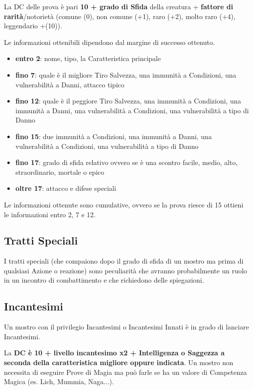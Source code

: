 \begin{multicols}{2}
\medskip

La DC delle prova è pari \textbf{10 + grado di Sfida} della creatura + \textbf{fattore di rarità}/notorietà (comune (0), non comune (+1), raro (+2), molto raro (+4), leggendario +(10)).

Le informazioni ottenibili dipendono dal margine di successo ottenuto.

\noindent\begin{itemize} \setlength{\itemsep}{0pt}
\item \textbf{entro 2}: nome, tipo, la Caratteristica principale
\item \textbf{fino 7}: quale è il migliore Tiro Salvezza, una immunità a Condizioni, una vulnerabilità a Danni, attacco tipico
\item \textbf{fino 12}: quale è il peggiore Tiro Salvezza, una immunità a Condizioni, una immunità a Danni, una vulnerabilità a Condizioni, una vulnerabilità a tipo di Danno
\item \textbf{fino 15}: due immunità a Condizioni, una immunità a Danni, una vulnerabilità a Condizioni, una vulnerabilità a tipo di Danno
\item \textbf{fino 17}: grado di sfida relativo ovvero se è una scontro facile, medio, alto, straordinario, mortale o epico
\item \textbf{oltre 17}: attacco e difese speciali
\end{itemize}

\medskip

Le informazioni ottenute sono cumulative, ovvero se la prova riesce di 15 ottieni le informazioni entro 2, 7 e 12.

\subsection{Tratti Speciali}

I tratti speciali (che compaiono dopo il grado di sfida di un mostro ma prima di qualsiasi Azione o reazione) sono peculiarità che avranno probabilmente un ruolo in un incontro di combattimento e che richiedono delle spiegazioni.

\subsection{Incantesimi}

Un mostro con il privilegio Incantesimi o Incantesimi Innati è in grado di lanciare Incantesimi.

La \textbf{DC è 10 + livello incantesimo x2 + Intelligenza o Saggezza a seconda della caratteristica migliore oppure indicata}. Un mostro non necessita di eseguire Prove di Magia ma può farle se ha un valore di Competenza Magica (es. Lich, Mummia, Naga...).


\end{multicols}
